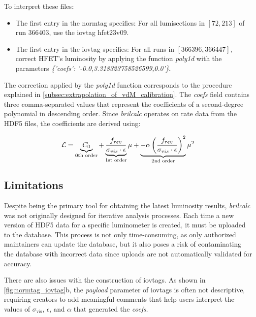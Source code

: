 To interpret these files:
\begin{itemize}
	\item The first entry in the normtag specifies: For all lumisections in $[72, 213]$ of run 366403, use the iovtag hfet23v09.
	\item The first entry in the iovtag specifies: For all runs in $[366396, 366447]$, correct HFET's luminosity by applying the function \textit{poly1d} with the parameters \textit{\{'coefs': '-0.0,3.318323758526599,0.0'\}}.
\end{itemize}

The correction applied by the \textit{poly1d} function corresponds to the procedure explained in \autoref{subsec:extrapolation_of_vdM_calibration}. The \textit{coefs} field contains three comma-separated values that represent the coefficients of a second-degree polynomial in descending order. Since \textit{brilcalc} operates on rate data from the HDF5 files, the coefficients are derived using:

\begin{equation}
    \centering
    \mathcal{L} = \underbrace{C_0}_{\text{0th order}} + \underbrace{\frac{f_{rev}}{\sigma_{vis} \cdot \epsilon}}_{\text{1st order}} \mu + \underbrace{- \alpha \left( \frac{f_{rev}}{\sigma_{vis} \cdot \epsilon} \right)^{2}}_{\text{2nd order}} \mu^2
    \label{eq:brilcalc_poly1d}
\end{equation}

\subsection{Limitations}

Despite being the primary tool for obtaining the latest luminosity results, \textit{brilcalc} was not originally designed for iterative analysis processes. Each time a new version of HDF5 data for a specific luminometer is created, it must be uploaded to the database. This process is not only time-consuming, as only authorized maintainers can update the database, but it also poses a risk of contaminating the database with incorrect data since uploads are not automatically validated for accuracy.

There are also issues with the construction of iovtags. As shown in \autoref{fig:normtag_iovtag}b, the \textit{payload} parameter of iovtags is often not descriptive, requiring creators to add meaningful comments that help users interpret the values of $\sigma_{\text{vis}}$, $\epsilon$, and $\alpha$ that generated the \textit{coefs}.

